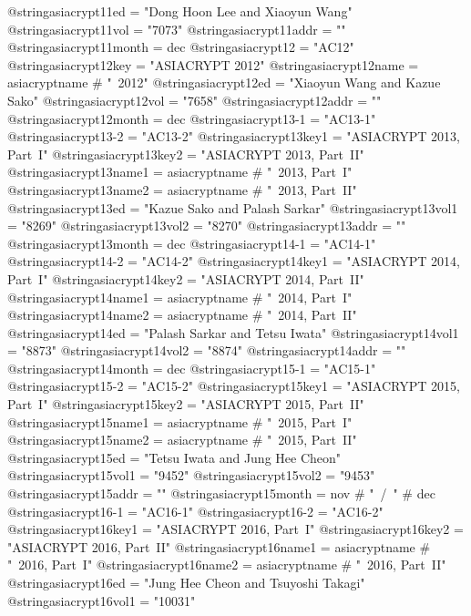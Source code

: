 @string{asiacrypt11ed =         "Dong Hoon Lee and Xiaoyun Wang"}
@string{asiacrypt11vol =        "7073"}
@string{asiacrypt11addr =       ""}
@string{asiacrypt11month =      dec}
@string{asiacrypt12 =           "AC12"}
@string{asiacrypt12key =        "ASIACRYPT 2012"}
@string{asiacrypt12name =       asiacryptname # "~2012"}
@string{asiacrypt12ed =         "Xiaoyun Wang and Kazue Sako"}
@string{asiacrypt12vol =        "7658"}
@string{asiacrypt12addr =       ""}
@string{asiacrypt12month =      dec}
@string{asiacrypt13-1 =         "AC13-1"}
@string{asiacrypt13-2 =         "AC13-2"}
@string{asiacrypt13key1 =       "ASIACRYPT 2013, Part~I"}
@string{asiacrypt13key2 =       "ASIACRYPT 2013, Part~II"}
@string{asiacrypt13name1 =      asiacryptname # "~2013, Part~I"}
@string{asiacrypt13name2 =      asiacryptname # "~2013, Part~II"}
@string{asiacrypt13ed =         "Kazue Sako and Palash Sarkar"}
@string{asiacrypt13vol1 =       "8269"}
@string{asiacrypt13vol2 =       "8270"}
@string{asiacrypt13addr =       ""}
@string{asiacrypt13month =      dec}
@string{asiacrypt14-1 =         "AC14-1"}
@string{asiacrypt14-2 =         "AC14-2"}
@string{asiacrypt14key1 =       "ASIACRYPT 2014, Part~I"}
@string{asiacrypt14key2 =       "ASIACRYPT 2014, Part~II"}
@string{asiacrypt14name1 =      asiacryptname # "~2014, Part~I"}
@string{asiacrypt14name2 =      asiacryptname # "~2014, Part~II"}
@string{asiacrypt14ed =         "Palash Sarkar and Tetsu Iwata"}
@string{asiacrypt14vol1 =       "8873"}
@string{asiacrypt14vol2 =       "8874"}
@string{asiacrypt14addr =       ""}
@string{asiacrypt14month =      dec}
@string{asiacrypt15-1 =         "AC15-1"}
@string{asiacrypt15-2 =         "AC15-2"}
@string{asiacrypt15key1 =       "ASIACRYPT 2015, Part~I"}
@string{asiacrypt15key2 =       "ASIACRYPT 2015, Part~II"}
@string{asiacrypt15name1 =      asiacryptname # "~2015, Part~I"}
@string{asiacrypt15name2 =      asiacryptname # "~2015, Part~II"}
@string{asiacrypt15ed =         "Tetsu Iwata and Jung Hee Cheon"}
@string{asiacrypt15vol1 =       "9452"}
@string{asiacrypt15vol2 =       "9453"}
@string{asiacrypt15addr =       ""}
@string{asiacrypt15month =      nov # "~/~" # dec}
@string{asiacrypt16-1 =         "AC16-1"}
@string{asiacrypt16-2 =         "AC16-2"}
@string{asiacrypt16key1 =       "ASIACRYPT 2016, Part~I"}
@string{asiacrypt16key2 =       "ASIACRYPT 2016, Part~II"}
@string{asiacrypt16name1 =      asiacryptname # "~2016, Part~I"}
@string{asiacrypt16name2 =      asiacryptname # "~2016, Part~II"}
@string{asiacrypt16ed =         "Jung Hee Cheon and Tsuyoshi Takagi"}
@string{asiacrypt16vol1 =       "10031"}
